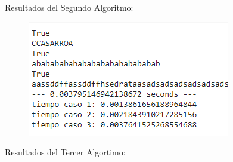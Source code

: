 \documentclass[]{article}
\numberwithin{equation}{section}
\numberwithin{figure}{section}
\theoremstyle{definition}
\begin{document}
\text Resultados del Segundo Algoritmo:

\begin{figure}[H]
	\includegraphics{Algoritmo 2}
    \centering
\end{figure}

\text Resultados del Tercer Algortimo:
\end{document}
